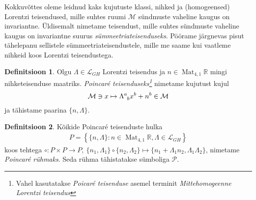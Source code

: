 \documentclass[a4paper,12pt]{article}
\theoremstyle{plain}
\theoremstyle{definition}
\newtheorem{definitsioon}{Definitsioon}[section]
\numberwithin{equation}{section}
\def\R{{\mathbb R}}
\def\L{{\mathcal L}}
\def\M{{\mathcal M}}
\def\P{{\mathcal P}}
\DeclareMathOperator{\Mat}{Mat}
\begin{document}
Kokkuvõttes oleme leidnud kaks kujutuste klassi, nihked ja (homogeensed) Lorentzi teisendused, mille suhtes ruumi $\M$ sündmuste vaheline kaugus on invariantne. Üldisemalt nimetame teisendust, mille suhtes sündmuste vaheline kaugus on invariantne suurus \emph{sümmeetriateisenduseks}. Pöörame järgnevas pisut tähelepanu sellistele sümmeetria\-teisendustele, mille me saame kui vaatleme nihkeid koos Lorentzi teisendustega.

\begin{definitsioon}
Olgu $\Lambda \in \L_{GH}$ Lorentzi teisendus ja $n \in \Mat_{4, 1}\R$ mingi nihketeisenduse maatriks. \emph{Poincar\'e teisenduseks\footnote{Vahel kasutatakse \emph{Poicar\'e teisenduse} asemel terminit \emph{Mittehomogeenne Lorentzi teisendus}}} nimetame kujutust kujul
\begin{align*}
\M \ni x \mapsto \Lambda\indices{^a_b} x^b + n^b \in \M
\end{align*}
ja tähistame paarina $\{n, \Lambda\}$.
\end{definitsioon}

\begin{definitsioon} \textnormal{\cite{Barut}}
Kõikide Poincar\'e teisenduste hulka
\begin{align*}
P = \left\lbrace \{n, \Lambda\} : n \in \Mat_{4, 1}\R, \Lambda \in \L_{GH} \right\rbrace
\end{align*}
koos tehtega $\circ : P \times P \rightarrow P,\ \{n_1, \Lambda_1\} \circ \{n_2, \Lambda_2\} \mapsto \{n_1 + \Lambda_1 n_2, \Lambda_1 \Lambda_2\}$, nimetame \emph{Poincar\'e rühmaks}. Seda rühma tähistatakse sümboliga $\P$.
\end{definitsioon}
\end{document}
